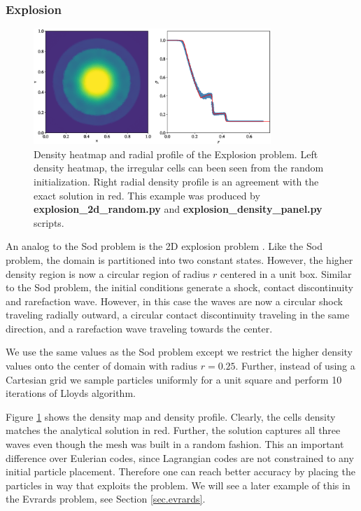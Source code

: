 \subsubsection{Explosion}
\begin{figure}
    \begin{center}
        \includegraphics[width=0.8\textwidth]{figures/explosion_2d.eps}
        \caption{Density heatmap and radial profile of the Explosion problem. Left density
        heatmap, the irregular cells can been seen from the random initialization. Right
        radial density profile is an agreement with the exact solution in red.
        This example was produced by \textbf{explosion\_2d\_random.py} and 
        \textbf{explosion\_density\_panel.py} scripts.}
        \label{fig.explosion_2d}
    \end{center}
\end{figure}
An analog to the Sod problem is the 2D explosion problem \citep{toro-1997}. Like the Sod problem, 
the domain is partitioned into two constant states. However, the higher density region is now a 
circular region of radius $r$ centered in a unit box. Similar to the Sod problem, the initial 
conditions generate a shock, contact discontinuity and rarefaction wave. However, in this case
the waves are now a circular shock traveling radially outward, a circular contact
discontinuity traveling in the same direction, and a rarefaction wave traveling towards the
center.

We use the same values as the Sod problem except we restrict the higher density values onto
the center of domain with radius $r=0.25$. Further, instead of using a Cartesian grid we sample
particles uniformly for a unit square and perform 10 iterations of Lloyds algorithm. 

Figure \ref{fig.explosion_2d} shows the density map and density profile. Clearly, the cells
density matches the analytical solution in red. Further, the solution captures all three waves
even though the mesh was built in a random fashion. This an important difference over Eulerian
codes, since Lagrangian codes are not constrained to any initial particle placement. Therefore
one can reach better accuracy by placing the particles in way that exploits the problem. We will
see a later example of this in the Evrards problem, see Section \ref{sec.evrards}.

